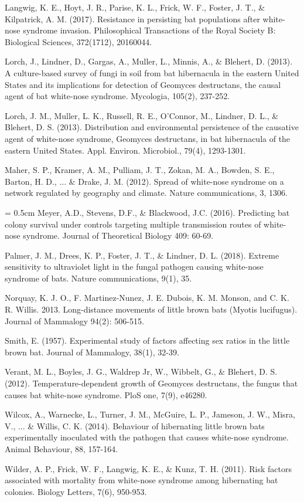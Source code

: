 \documentclass[12pt]{article}
\begin{document}
\hangindent=0.5cm Langwig, K. E., Hoyt, J. R., Parise, K. L., Frick, W. F., Foster, J. T., & Kilpatrick, A. M. (2017). Resistance in persisting bat populations after white-nose syndrome invasion. Philosophical Transactions of the Royal Society B: Biological Sciences, 372(1712), 20160044.
 
\hangindent=0.5cm Lorch, J., Lindner, D., Gargas, A., Muller, L., Minnis, A., & Blehert, D. (2013). A culture-based survey of fungi in soil from bat hibernacula in the eastern United States and its implications for detection of Geomyces destructans, the causal agent of bat white-nose syndrome. Mycologia, 105(2), 237-252.

\hangindent=0.5cm Lorch, J. M., Muller, L. K., Russell, R. E., O'Connor, M., Lindner, D. L., & Blehert, D. S. (2013). Distribution and environmental persistence of the causative agent of white-nose syndrome, Geomyces destructans, in bat hibernacula of the eastern United States. Appl. Environ. Microbiol., 79(4), 1293-1301.
 
\hangindent=0.5cm Maher, S. P., Kramer, A. M., Pulliam, J. T., Zokan, M. A., Bowden, S. E., Barton, H. D., ... & Drake, J. M. (2012). Spread of white-nose syndrome on a network regulated by geography and climate. Nature communications, 3, 1306.

\hangindent= 0.5cm Meyer, A.D., Stevens, D.F., & Blackwood, J.C. (2016). Predicting bat colony survival under controls targeting multiple transmission routes of white-nose syndrome. Journal of Theoretical Biology 409: 60-69.
 
\hangindent=0.5cm Palmer, J. M., Drees, K. P., Foster, J. T., & Lindner, D. L. (2018). Extreme sensitivity to ultraviolet light in the fungal pathogen causing white-nose syndrome of bats. Nature communications, 9(1), 35.
 
 
\hangindent=0.5cm Norquay, K. J. O., F. Martinez-Nunez, J. E. Dubois, K. M. Monson, and C. K. R. Willis. 2013. Long-distance movements of little brown bats (Myotis lucifugus). Journal of Mammalogy 94(2): 506-515.
 
\hangindent=0.5cm Smith, E. (1957). Experimental study of factors affecting sex ratios in the little brown bat. Journal of Mammalogy, 38(1), 32-39.
 
\hangindent=0.5cm Verant, M. L., Boyles, J. G., Waldrep Jr, W., Wibbelt, G., & Blehert, D. S. (2012). Temperature-dependent growth of Geomyces destructans, the fungus that causes bat white-nose syndrome. PloS one, 7(9), e46280.
 
\hangindent=0.5cm Wilcox, A., Warnecke, L., Turner, J. M., McGuire, L. P., Jameson, J. W., Misra, V., ... & Willis, C. K. (2014). Behaviour of hibernating little brown bats experimentally inoculated with the pathogen that causes white-nose syndrome. Animal Behaviour, 88, 157-164.

\hangindent=0.5cm Wilder, A. P., Frick, W. F., Langwig, K. E., & Kunz, T. H. (2011). Risk factors associated with mortality from white-nose syndrome among hibernating bat colonies. Biology Letters, 7(6), 950-953.

    
\end{document}
